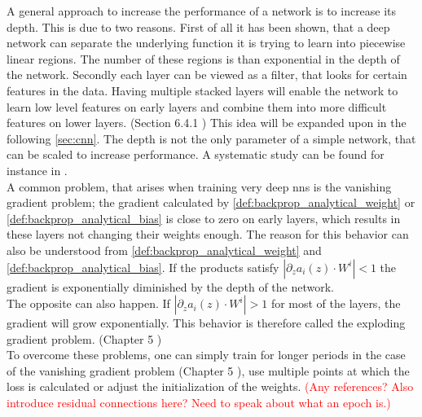 A general approach to increase the performance of a network is to increase its depth. This is due to two reasons. First of all it has been shown, that a deep network can separate the underlying function it is trying to learn into piecewise linear regions. The number of these regions is than exponential in the depth of the network. Secondly each layer can be viewed as a filter, that looks for certain features in the data. Having multiple stacked layers will enable the network to learn low level features on early layers and combine them into more difficult features on lower layers. (Section 6.4.1 \cite{deep_learning_book}) This idea will be expanded upon in the following \autoref{sec:cnn}. The depth is not the only parameter of a simple network, that can be scaled to increase performance. A systematic study can be found for instance in \cite{efficient_net}.\\
A common problem, that arises when training very deep \gls{nns} is the vanishing gradient problem; the gradient calculated by \eqref{def:backprop_analytical_weight} or \eqref{def:backprop_analytical_bias} is close to zero on early layers, which results in these layers not changing their weights enough. The reason for this behavior can also be understood from \eqref{def:backprop_analytical_weight} and \eqref{def:backprop_analytical_bias}. If the products satisfy $\left|\partial_z a_i(z)\cdot W^i\right|<1$ the gradient is exponentially diminished by the depth of the network.\\
The opposite can also happen. If $\left|\partial_z a_i(z)\cdot W^i\right|>1$ for most of the layers, the gradient will grow exponentially. This behavior is therefore called the exploding gradient problem. (Chapter 5 \cite{deep_learning_beginning})\\
To overcome these problems, one can simply train for longer periods in the case of the vanishing gradient problem (Chapter 5 \cite{deep_learning_beginning}), use multiple points at which the loss is calculated \cite{inception_module} or adjust the initialization of the weights. \textcolor{red}{(Any references? Also introduce residual connections here? Need to speak about what an epoch is.)}
